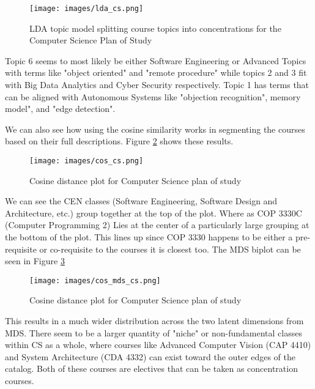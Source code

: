 \documentclass[11pt]{report}
\begin{document}
\begin{figure}[H]
  \centering
  
  \texttt{[image: images/lda\_cs.png]}
  \caption{LDA topic model splitting course topics into concentrations for the Computer Science Plan of Study}
  \label{fig:lda_cs}
\end{figure}

Topic 6 seems to most likely be either Software Engineering or Advanced Topics with terms like "object oriented" and "remote procedure" while topics 2 and 3 fit with Big Data 
Analytics and Cyber Security respectively. Topic 1 has terms that can be aligned with Autonomous Systems like "objection recognition", 
memory model", and "edge detection". 

We can also see how using the cosine similarity works in segmenting the courses based on their full descriptions. Figure \ref{fig:cos_cs} 
shows these results. 

\begin{figure}[H]
  \centering
  
  \texttt{[image: images/cos\_cs.png]}
  \caption{Cosine distance plot for Computer Science plan of study}
  \label{fig:cos_cs}
\end{figure}

We can see the CEN classes (Software Engineering, Software Design and Architecture, etc.) group together at the top of the plot. 
Where as COP 3330C (Computer Programming 2) Lies at the center of a particularly large grouping at the bottom of the plot. 
This lines up since COP 3330 happens to be either a pre-requisite or co-requisite to the courses it is closest too. The MDS 
biplot can be seen in Figure \ref{fig:cmds_cs}

\begin{figure}[H]
  \centering
  
  \texttt{[image: images/cos\_mds\_cs.png]}
  \caption{Cosine distance plot for Computer Science plan of study}
  \label{fig:cmds_cs}
\end{figure}

This results in a much wider distribution across the two latent dimensions from MDS. There seem to be a larger quantity of 
"niche" or non-fundamental classes within CS as a whole, where courses like Advanced Computer Vision (CAP 4410) and 
System Architecture (CDA 4332) can exist toward the outer edges of the catalog. Both of these courses are electives that can be taken 
as concentration courses. 
\end{document}
